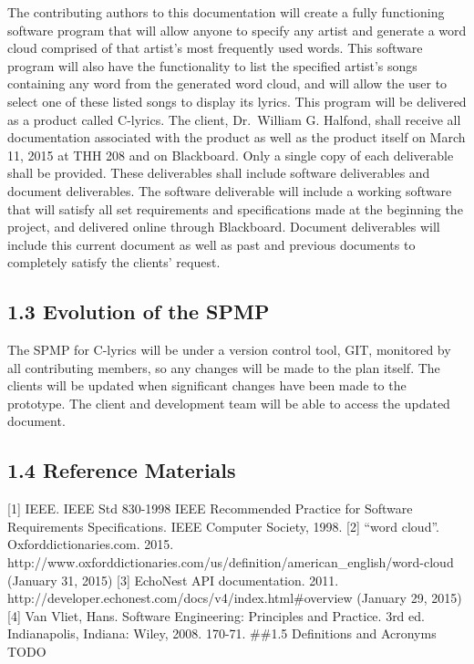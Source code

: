 \documentclass[]{article}
\begin{document}
The contributing authors to this documentation will create a fully
functioning software program that will allow anyone to specify any
artist and generate a word cloud comprised of that artist's most
frequently used words. This software program will also have the
functionality to list the specified artist's songs containing any word
from the generated word cloud, and will allow the user to select one of
these listed songs to display its lyrics. This program will be delivered
as a product called C-lyrics. The client, Dr.~William G. Halfond, shall
receive all documentation associated with the product as well as the
product itself on March 11, 2015 at THH 208 and on Blackboard. Only a
single copy of each deliverable shall be provided. These deliverables
shall include software deliverables and document deliverables. The
software deliverable will include a working software that will satisfy
all set requirements and specifications made at the beginning the
project, and delivered online through Blackboard. Document deliverables
will include this current document as well as past and previous
documents to completely satisfy the clients' request.

\subsection{1.3 Evolution of the SPMP}\label{evolution-of-the-spmp}

The SPMP for C-lyrics will be under a version control tool, GIT,
monitored by all contributing members, so any changes will be made to
the plan itself. The clients will be updated when significant changes
have been made to the prototype. The client and development team will be
able to access the updated document.

\subsection{1.4 Reference Materials}\label{reference-materials}

{[}1{]} IEEE. IEEE Std 830-1998 IEEE Recommended Practice for Software
Requirements Specifications. IEEE Computer Society, 1998. {[}2{]} ``word
cloud''. Oxforddictionaries.com. 2015.
http://www.oxforddictionaries.com/us/definition/american\_english/word-cloud
(January 31, 2015) {[}3{]} EchoNest API documentation. 2011.
http://developer.echonest.com/docs/v4/index.html\#overview (January 29,
2015) {[}4{]} Van Vliet, Hans. Software Engineering: Principles and
Practice. 3rd ed. Indianapolis, Indiana: Wiley, 2008. 170-71. \#\#1.5
Definitions and Acronyms TODO
\end{document}
